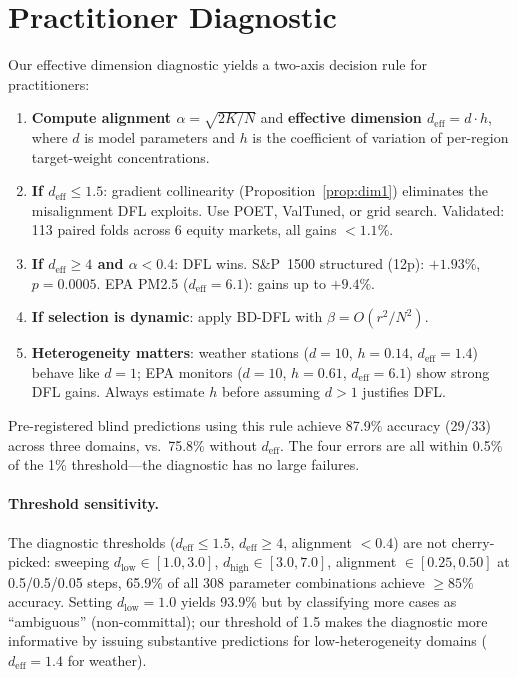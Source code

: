 \documentclass[letterpaper]{article}
\begin{document}
\section{Practitioner Diagnostic}
\label{app:diagnostic}

Our effective dimension diagnostic yields a two-axis decision rule for practitioners:

\begin{enumerate}
  \item \textbf{Compute alignment $\alpha = \sqrt{2K/N}$} and \textbf{effective dimension $d_{\text{eff}} = d \cdot h$}, where $d$ is model parameters and $h$ is the coefficient of variation of per-region target-weight concentrations.
  \item \textbf{If $d_{\text{eff}} \leq 1.5$}: gradient collinearity (Proposition~\ref{prop:dim1}) eliminates the misalignment DFL exploits. Use POET, ValTuned, or grid search. Validated: 113 paired folds across 6 equity markets, all gains $< 1.1\%$.
  \item \textbf{If $d_{\text{eff}} \geq 4$ and $\alpha < 0.4$}: DFL wins. S\&P~1500 structured (12p): $+1.93\%$, $p{=}0.0005$. EPA PM2.5 ($d_{\text{eff}}{=}6.1$): gains up to $+9.4\%$.
  \item \textbf{If selection is dynamic}: apply BD-DFL with $\beta = O(r^2/N^2)$.
  \item \textbf{Heterogeneity matters}: weather stations ($d{=}10$, $h{=}0.14$, $d_{\text{eff}}{=}1.4$) behave like $d{=}1$; EPA monitors ($d{=}10$, $h{=}0.61$, $d_{\text{eff}}{=}6.1$) show strong DFL gains. Always estimate $h$ before assuming $d > 1$ justifies DFL.
\end{enumerate}

Pre-registered blind predictions using this rule achieve 87.9\% accuracy (29/33) across three domains, vs.\ 75.8\% without $d_{\text{eff}}$. The four errors are all within 0.5\% of the 1\% threshold---the diagnostic has no large failures.

\paragraph{Threshold sensitivity.} The diagnostic thresholds ($d_{\text{eff}} \leq 1.5$, $d_{\text{eff}} \geq 4$, alignment $< 0.4$) are not cherry-picked: sweeping $d_{\text{low}} \in [1.0, 3.0]$, $d_{\text{high}} \in [3.0, 7.0]$, alignment $\in [0.25, 0.50]$ at 0.5/0.5/0.05 steps, 65.9\% of all 308 parameter combinations achieve $\geq 85\%$ accuracy. Setting $d_{\text{low}} = 1.0$ yields 93.9\% but by classifying more cases as ``ambiguous'' (non-committal); our threshold of 1.5 makes the diagnostic more informative by issuing substantive predictions for low-heterogeneity domains ($d_{\text{eff}} = 1.4$ for weather).
\end{document}
